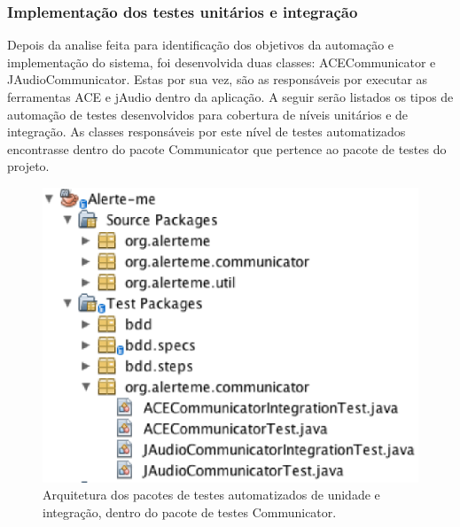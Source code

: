 \subsubsection{Implementação dos testes unitários e integração}

Depois da analise feita para identificação dos objetivos da automação e implementação do sistema, foi desenvolvida duas classes: ACECommunicator e JAudioCommunicator. Estas por sua vez, são as responsáveis por executar as ferramentas ACE e jAudio dentro da aplicação. A seguir serão listados os tipos de automação de testes desenvolvidos para cobertura de níveis unitários e de integração. As classes responsáveis por este nível de testes automatizados encontrasse dentro do pacote Communicator que pertence ao pacote de testes do projeto.  

\begin{figure}[H]
	\centering
	\captionsetup{justification=centering,margin=2cm}
	\includegraphics[scale=0.80]{capitulos/validacao/figuras/testesUnitEdIntegra.eps}
	\caption{Arquitetura dos pacotes de testes automatizados de unidade e integração, dentro do pacote de testes Communicator.}
	\label{fig:result-engajamento}
\end{figure}


